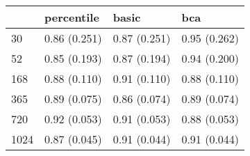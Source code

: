 \begin{tabular}{llll}
\toprule
 & percentile & basic & bca \\
\midrule
30 & 0.86 (0.251) & 0.87 (0.251) & 0.95 (0.262) \\
52 & 0.85 (0.193) & 0.87 (0.194) & 0.94 (0.200) \\
168 & 0.88 (0.110) & 0.91 (0.110) & 0.88 (0.110) \\
365 & 0.89 (0.075) & 0.86 (0.074) & 0.89 (0.074) \\
720 & 0.92 (0.053) & 0.91 (0.053) & 0.88 (0.053) \\
1024 & 0.87 (0.045) & 0.91 (0.044) & 0.91 (0.044) \\
\bottomrule
\end{tabular}
